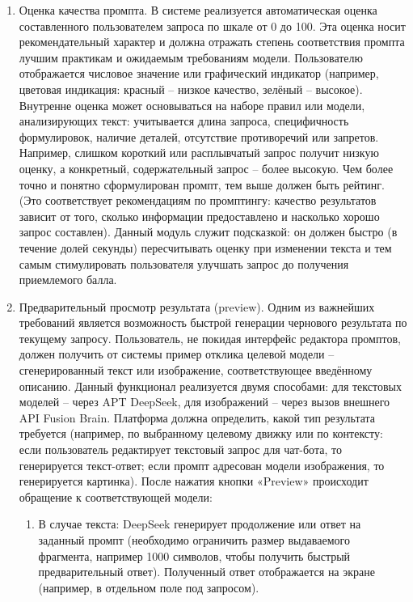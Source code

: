 \begin{enumerate}[label=\arabic*]
    \item Оценка качества промпта. В системе реализуется автоматическая оценка составленного пользователем запроса по шкале от 0 до 100. Эта оценка носит рекомендательный характер и должна отражать степень соответствия промпта лучшим практикам и ожидаемым требованиям модели. Пользователю отображается числовое значение или графический индикатор (например, цветовая индикация: красный – низкое качество, зелёный – высокое). Внутренне оценка может основываться на наборе правил или модели, анализирующих текст: учитывается длина запроса, специфичность формулировок, наличие деталей, отсутствие противоречий или запретов. Например, слишком короткий или расплывчатый запрос получит низкую оценку, а конкретный, содержательный запрос – более высокую. Чем более точно и понятно сформулирован промпт, тем выше должен быть рейтинг. (Это соответствует рекомендациям по промптингу: качество результатов зависит от того, сколько информации предоставлено и насколько хорошо запрос составлен)\cite{promptingguide:basics}. Данный модуль служит подсказкой: он должен быстро (в течение долей секунды) пересчитывать оценку при изменении текста и тем самым стимулировать пользователя улучшать запрос до получения приемлемого балла.
    \item Предварительный просмотр результата (preview). Одним из важнейших требований является возможность быстрой генерации чернового результата по текущему запросу. Пользователь, не покидая интерфейс редактора промптов, должен получить от системы пример отклика целевой модели – сгенерированный текст или изображение, соответствующее введённому описанию. Данный функционал реализуется двумя способами: для текстовых моделей – через APT DeepSeek, для изображений – через вызов внешнего API Fusion Brain. Платформа должна определить, какой тип результата требуется (например, по выбранному целевому движку или по контексту: если пользователь редактирует текстовый запрос для чат-бота, то генерируется текст-ответ; если промпт адресован модели изображения, то генерируется картинка). После нажатия кнопки «Preview» происходит обращение к соответствующей модели:
    \begin{enumerate}[label=4.\arabic*]
        \item В случае текста: DeepSeek генерирует продолжение или ответ на заданный промпт (необходимо ограничить размер выдаваемого фрагмента, например 1000 символов, чтобы получить быстрый предварительный ответ). Полученный ответ отображается на экране (например, в отдельном поле под запросом).

\end{enumerate}
\end{enumerate}
